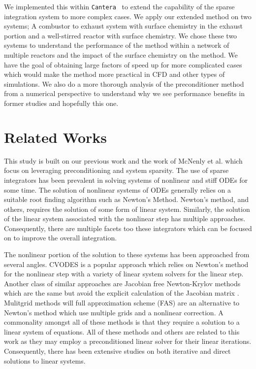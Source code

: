 \documentclass{article}
\newcommand{\sectionOne}[1]{\section{#1} \addvspace{10pt}}
\def\cantera{\texttt{Cantera}}
\def\cantera{\texttt{Cantera}}
\begin{document}
We implemented this within \cantera{}~\cite{cantera} to extend the capability of the sparse integration system to more complex cases.
We apply our extended method on two systems; A combustor to exhaust system with surface chemistry in the exhaust portion and a well-stirred reactor with surface chemistry.
We chose these two systems to understand the performance of the method within a network of multiple reactors and the impact of the surface chemistry on the method.
We have the goal of obtaining large factors of speed up for more complicated cases which would make the method more practical in CFD and other types of simulations.
We also do a more thorough analysis of the preconditioner method from a numerical perspective to understand why we see performance benefits in former studies \cite{mcnenly_faster_2015, walker2022generalized} and hopefully this one.

\sectionOne{Related Works}

This study is built on our previous work \cite{walker2022generalized} and the work of McNenly et al.\cite{mcnenly_faster_2015} which focus on leveraging preconditioning and system sparsity.
The use of sparse integrators has been prevalent in solving systems of nonlinear and stiff ODEs for some time.
The solution of nonlinear systems of ODEs generally relies on a suitable root finding algorithm such as Newton's Method.
Newton's method, and others, requires the solution of some form of linear system.
Similarly, the solution of the linear system associated with the nonlinear step has multiple approaches.
Consequently, there are multiple facets too these integrators which can be focused on to improve the overall integration.

The nonlinear portion of the solution to these systems has been approached from several angles.
CVODES is a popular approach which relies on Newton's method for the nonlinear step with a variety of linear system solvers for the linear step\cite{serban_cvodes_2003}.
Another class of similar approaches are Jacobian free Newton-Krylov methods which are the same but avoid the explicit calculation of the Jacobian matrix \cite{knoll2004jacobian}.
Mulitgrid methods will full approximation scheme (FAS) are an alternative to Newton's method which use multiple grids and a nonlinear correction\cite{henson2003multigrid}.
A commonality amongst all of these methods is that they require a solution to a linear system of equations.
All of these methods and others are related to this work as they may employ a preconditioned linear solver for their linear iterations.
Consequently, there has been extensive studies on both iterative and direct solutions to linear systems\cite{hageman2012applied, duff2017direct}.
\end{document}
